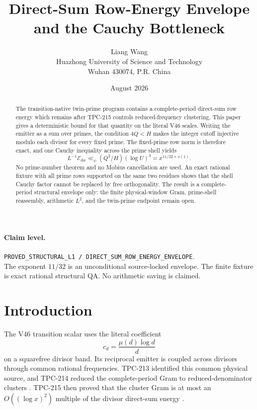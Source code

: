 \documentclass[11pt]{article}
\title{\textbf{Direct-Sum Row-Energy Envelope and the Cauchy Bottleneck}}
\author{Liang Wang\\
Huazhong University of Science and Technology\\
Wuhan 430074, P.R. China}
\date{August 2026}
\theoremstyle{definition}
\theoremstyle{remark}
\newcommand{\Edir}{\mathcal E_{\mathrm{dir}}}
\begin{document}
\maketitle

\begin{abstract}
The transition-native twin-prime program contains a complete-period direct-sum
row energy which remains after TPC-215 controls reduced-frequency clustering.
This paper gives a deterministic bound for that quantity on the literal V46
scales.  Writing the emitter as a sum over primes, the condition
\(4Q<H\) makes the integer cutoff injective modulo each divisor for every fixed
prime.  The fixed-prime row norm is therefore exact, and one Cauchy inequality
across the prime shell yields
\[
 L^{-1}\Edir \ll_{\psi} (Q^3/H)(\log U)^3
 = x^{11/32+o(1)}.
\]
No prime-number theorem and no Mobius cancellation are used.  An exact rational
fixture with all prime rows supported on the same two residues shows that the
shell Cauchy factor cannot be replaced by free orthogonality.  The result is a
complete-period structural envelope only: the finite physical-window Gram,
prime-shell reassembly, arithmetic \(L^2\), and the twin-prime endpoint remain
open.
\end{abstract}

\paragraph{Claim level.}
\texttt{PROVED\_STRUCTURAL\_L1 / DIRECT\_SUM\_ROW\_ENERGY\_ENVELOPE}.\\
The exponent \(11/32\) is an unconditional source-locked envelope.  The finite
fixture is exact rational structural QA.  No arithmetic saving is claimed.

\section{Introduction}

The V46 transition scalar uses the literal coefficient
\begin{equation}
 c_d=\frac{\mu(d)\log d}{d}
 \label{eq:coefficient}
\end{equation}
on a squarefree divisor band.  Its reciprocal emitter is coupled across
divisors through common rational frequencies.  TPC-213 identified this common
physical source, and TPC-214 reduced the complete-period Gram to
reduced-denominator clusters \cite{WangTPC214}.  TPC-215 then proved that the
cluster Gram is at most an \(O((\log x)^2)\) multiple of the divisor
direct-sum energy \cite{WangTPC215}.
\end{document}
